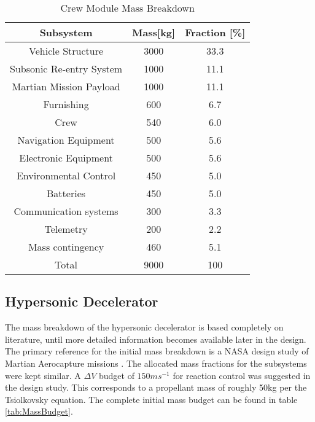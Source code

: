 \begin{table}[H]
	\centering
	\caption{Crew Module Mass Breakdown}
	\begin{tabular}{|c|c|c|}
    \hline
    Subsystem        					& Mass[kg] 	& Fraction [\%] \\ \hline \hline
    Vehicle Structure 				& 3000			& 33.3 					\\ \hline 
		Subsonic Re-entry System	& 1000			& 11.1					\\ \hline
		Martian Mission Payload 	& 1000			& 11.1 					\\ \hline
		Furnishing								& 600				& 6.7 					\\ \hline
		Crew											& 540				& 6.0						\\ \hline
		Navigation Equipment			& 500				& 5.6						\\ \hline
		Electronic Equipment 			& 500				& 5.6						\\ \hline
		Environmental Control			& 450				& 5.0						\\ \hline
		Batteries									&	450				&	5.0						\\ \hline
		Communication systems			& 300				& 3.3						\\ \hline
		Telemetry									& 200				& 2.2						\\ \hline
		Mass contingency					&	460				& 5.1						\\ \hline
		Total											&	9000			& 100						\\ \hline
    \end{tabular}
    \label{tab:CVMB}
\end{table}

\subsection{Hypersonic Decelerator}
The mass breakdown of the hypersonic decelerator is based completely on literature, until more detailed information becomes available later in the design. The primary reference for the initial mass breakdown is a NASA design study of Martian Aerocapture missions \cite{Cianciolo2010}. The allocated mass fractions for the subsystems were kept similar. A $\Delta V$ budget of $150 ms^{-1}$ for reaction control was suggested in the design study. This corresponds to a propellant mass of roughly 50kg per the Tsiolkovsky equation. The complete initial mass budget can be found in table \ref{tab:MassBudget}. 

